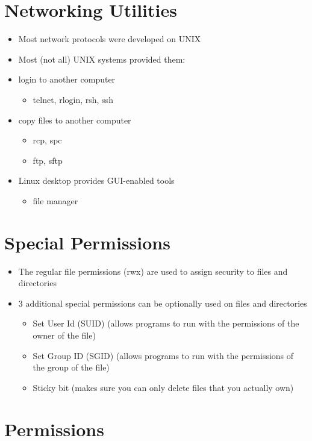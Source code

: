 \documentclass{report}
\begin{document}
\section{Networking Utilities}
\begin{itemize}
  \item Most network protocols were developed on UNIX 
  \item Most (not all) UNIX systems provided them:
    \bigbreak \noindent
  \item login to another computer
    \begin{itemize}[label=$\circ$]
    \item telnet, rlogin, rsh, ssh 
  \end{itemize}
\item copy files to another computer
  \begin{itemize}[label=$\circ$]
    \item rcp, spc 
    \item ftp, sftp
  \end{itemize}
\item Linux desktop provides GUI-enabled tools
  \begin{itemize}[label=$\circ$]
    \item file manager 
  \end{itemize}
\end{itemize}
\section{Special Permissions}
\begin{itemize}
  \item The regular file permissions (rwx) are used to assign security to files and directories
  \item 3 additional special permissions can be optionally used on files and directories
    \begin{itemize}[label=$\circ$]
    \item Set User Id (SUID) (allows programs to run with the permissions of the owner of the file)
    \item Set Group ID (SGID) (allows programs to run with the permissions of the group of the file)
    \item Sticky bit (makes sure you can only delete files that you actually own)
    \end{itemize}
\end{itemize}
\newpage
\section{Permissions}
\end{document}
